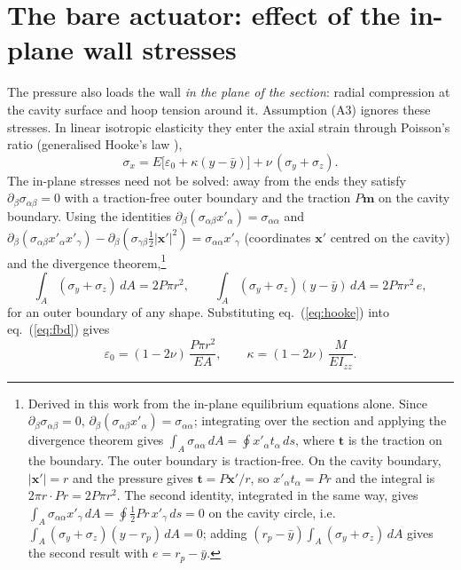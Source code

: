 \documentclass[12pt,a4paper,oneside]{report}
\numberwithin{equation}{chapter}
\numberwithin{figure}{chapter}
\numberwithin{table}{chapter}
\newcommand{\Izz}{I_{zz}}
\newcommand{\rp}{r_p}
\begin{document}
\section{The bare actuator: effect of the in-plane wall stresses}\label{sec:poisson}
The pressure also loads the wall \emph{in the plane of the section}: radial compression at the cavity
surface and hoop tension around it. Assumption (A3) ignores these stresses. In linear isotropic elasticity
they enter the axial strain through Poisson's ratio (generalised Hooke's law \cite{timoshenko1970}),
\begin{equation}
\sigma_x = E\big[\varepsilon_0 + \kappa(y-\bar y)\big] + \nu\,(\sigma_y+\sigma_z). \label{eq:hooke}
\end{equation}
The in-plane stresses need not be solved: away from the ends they satisfy
$\partial_\beta\sigma_{\alpha\beta}=0$ with a traction-free outer boundary and the traction $P\bm m$ on the
cavity boundary. Using the identities
$\partial_\beta(\sigma_{\alpha\beta}x'_\alpha)=\sigma_{\alpha\alpha}$ and
$\partial_\beta(\sigma_{\alpha\beta}x'_\alpha x'_\gamma)-\partial_\beta(\sigma_{\gamma\beta}\tfrac12|\bm x'|^2)=\sigma_{\alpha\alpha}x'_\gamma$
(coordinates $\bm x'$ centred on the cavity) and the divergence theorem,\footnote{Derived in this work
from the in-plane equilibrium equations alone. Since $\partial_\beta\sigma_{\alpha\beta}=0$,
$\partial_\beta(\sigma_{\alpha\beta}x'_\alpha)=\sigma_{\alpha\alpha}$; integrating over the section and applying
the divergence theorem gives $\int_A\sigma_{\alpha\alpha}\,dA=\oint x'_\alpha t_\alpha\,ds$, where $\bm t$ is the
traction on the boundary. The outer boundary is traction-free. On the cavity boundary, $|\bm x'|=r$ and the
pressure gives $\bm t=P\bm x'/r$, so $x'_\alpha t_\alpha=Pr$ and the integral is $2\pi r\cdot Pr=2P\pi r^2$. The
second identity, integrated in the same way, gives $\int_A\sigma_{\alpha\alpha}x'_\gamma\,dA
=\oint\tfrac12 Pr\,x'_\gamma\,ds=0$ on the cavity circle, i.e.\ $\int_A(\sigma_y+\sigma_z)(y-\rp)\,dA=0$; adding
$(\rp-\bar y)\int_A(\sigma_y+\sigma_z)\,dA$ gives the second result with $e=\rp-\bar y$.}
\begin{equation}
\int_A(\sigma_y+\sigma_z)\,dA = 2P\pi r^2,\qquad \int_A(\sigma_y+\sigma_z)(y-\bar y)\,dA = 2P\pi r^2\,e ,
\end{equation}
for an outer boundary of any shape. Substituting eq.~(\ref{eq:hooke}) into eq.~(\ref{eq:fbd}) gives
\begin{equation}
\varepsilon_0 = (1-2\nu)\,\frac{P\pi r^2}{EA},\qquad
\kappa = (1-2\nu)\,\frac{M}{E\Izz}. \label{eq:poisson}
\end{equation}
\end{document}
